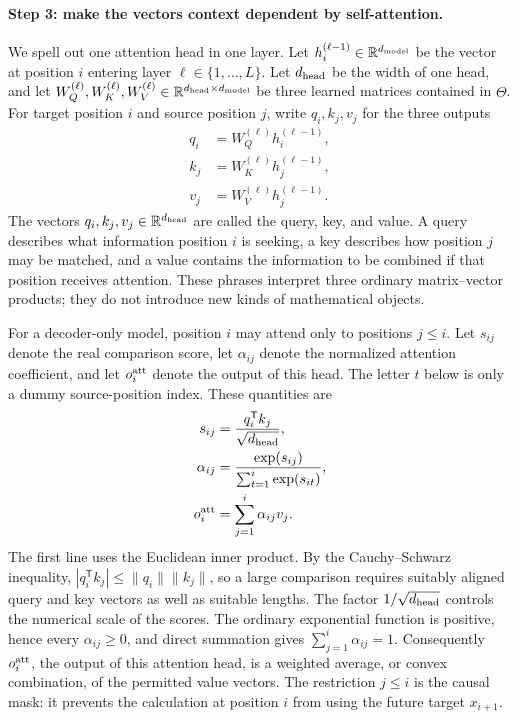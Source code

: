 \documentclass[
  aps,
  reprint,
  superscriptaddress,
  floatfix,
  nofootinbib,
  longbibliography
]{revtex4-2}
\newcommand{\R}{\mathbb{R}}
\newcommand{\T}{^{\mathsf{T}}}
\newcommand{\norm}[1]{\lVert #1 \rVert}
\begin{document}
\paragraph{Step 3: make the vectors context dependent by self-attention.}
We spell out one attention head in one layer.  Let
$h_i^{(\ell-1)}\in\R^{d_{\rm model}}$ be the vector at position $i$ entering layer
$\ell\in\{1,\ldots,L\}$.  Let $d_{\rm head}$ be the width of one head, and let
$W_Q^{(\ell)},W_K^{(\ell)},W_V^{(\ell)}\in
\R^{d_{\rm head}\times d_{\rm model}}$ be three learned matrices contained in
$\Theta$.  For target position $i$ and source position $j$, write
$q_i,k_j,v_j$ for the three outputs
\begin{equation}
\label{eq:app-qkv}
\begin{aligned}
q_i&=W_Q^{(\ell)}h_i^{(\ell-1)},\\
k_j&=W_K^{(\ell)}h_j^{(\ell-1)},\\
v_j&=W_V^{(\ell)}h_j^{(\ell-1)}.
\end{aligned}
\end{equation}
The vectors $q_i,k_j,v_j\in\R^{d_{\rm head}}$ are called the query, key, and
value.  A query describes what information position $i$ is seeking, a key
describes how position $j$ may be matched, and a value contains the information
to be combined if that position receives attention.  These phrases interpret
three ordinary matrix--vector products; they do not introduce new kinds of
mathematical objects.

For a decoder-only model, position $i$ may attend only to positions
$j\leq i$.  Let $s_{ij}$ denote the real comparison score, let
$\alpha_{ij}$ denote the normalized attention coefficient, and let
$o_i^{\rm att}$ denote the output of this head.  The letter $t$ below is only a
dummy source-position index.  These quantities are
\begin{equation}
\label{eq:app-attention-expanded}
\begin{aligned}
s_{ij}&=\frac{q_i\T k_j}{\sqrt{d_{\rm head}}},\\
\alpha_{ij}
&=\frac{\exp(s_{ij})}
{\sum_{t=1}^{i}\exp(s_{it})},\\
o_i^{\rm att}&=\sum_{j=1}^{i}\alpha_{ij}v_j.
\end{aligned}
\end{equation}
The first line uses the Euclidean inner product.  By the Cauchy--Schwarz
inequality, $|q_i\T k_j|\leq\norm{q_i}\norm{k_j}$, so a large comparison
requires suitably aligned query and key vectors as well as suitable lengths.
The factor $1/\sqrt{d_{\rm head}}$ controls the numerical scale of the scores.
The ordinary exponential function is positive, hence every
$\alpha_{ij}\geq0$, and direct summation gives
$\sum_{j=1}^{i}\alpha_{ij}=1$.  Consequently $o_i^{\rm att}$, the output of
this attention head, is a weighted average, or convex combination, of the
permitted value vectors.  The restriction $j\leq i$
is the causal mask: it prevents the calculation at position $i$ from using the
future target $x_{i+1}$.
\end{document}
